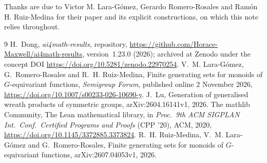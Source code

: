 \documentclass[11pt]{article}
\theoremstyle{remark}
\newcommand{\repoversion}{1.23.0}
\begin{document}
\medskip
\noindent Thanks are due to Victor M. Lara-G\'omez, Gerardo Romero-Rosales and
Ram\'on H. Ruiz-Medina for their paper and its explicit constructions, on
which this note relies throughout.

\begin{thebibliography}{9}
 H.~Dong, \emph{ai4math-results}, repository,
\url{https://github.com/Horace-Maxwell/ai4math-results}, version~\repoversion{}
(2026); archived at Zenodo under the concept DOI
\url{https://doi.org/10.5281/zenodo.22970254}.
 V.~M. Lara-G\'omez, G.~Romero-Rosales and R.~H. Ruiz-Medina,
Finite generating sets for monoids of $G$-equivariant functions,
\emph{Semigroup Forum}, published online 2 November 2026,
\url{https://doi.org/10.1007/s00233-026-10690-y}.
 J.~Lu, Generation of generalised wreath products of symmetric
groups, arXiv:2604.16141v1, 2026.
The mathlib Community, The Lean mathematical library, in \emph{Proc.\ 9th ACM
SIGPLAN Int.\ Conf.\ Certified Programs and Proofs} (CPP '20), ACM, 2020,
\url{https://doi.org/10.1145/3372885.3373824}.
 R.~H. Ruiz-Medina, V.~M. Lara-G\'omez and G.~Romero-Rosales,
Finite generating sets for monoids of $G$-equivariant functions,
arXiv:2607.04053v1, 2026.
\end{thebibliography}
\end{document}
